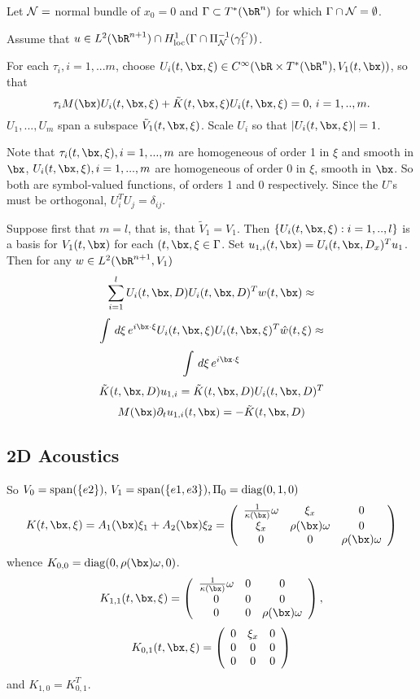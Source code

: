 Let ${\cal N} = $ normal bundle of $x_0=0$ and $\Gamma \subset T^*(\bR^n)$ for which $\Gamma \cap {\cal N} = \emptyset$.

Assume that $u \in L^2(\bR^{n+1}) \cap H^1_{\rm loc}(\Gamma \cap \Pi_{\cal N}^{-1}(\gamma_1^C))$.



For each $\tau_i, i =1,...m$, choose $U_i(t,\bx,\xi) \in C^{\infty}(\bR \times T^*(\bR^n),V_1(t,\bx))$,  so that
\[
  \tau_i M(\bx) U_i(t,\bx,\xi) + \tilde{K}(t,\bx,\xi) U_i(t,\bx,\xi)=0, \, i=1,..,m.
\]
$U_1,...,U_m$ span a subspace $\tilde{V}_1(t,\bx,\xi)$. Scale $U_i$ so that $|U_i(t,\bx,\xi)| = 1$.

Note that $\tau_i(t,\bx,\xi), i=1,...,m$ are homogeneous of order 1 in $\xi$ and smooth in $\bx$, $U_i(t,\bx,\xi), i=1,...,m$ are homogeneous of order 0 in $\xi$, smooth in $\bx$. So both are symbol-valued functions, of orders 1 and 0 respectively. Since the $U$'s must be orthogonal, $U_i^TU_j = \delta_{ij}$.

Suppose first that $m=l$, that is, that $\tilde{V}_1=V_1$. Then $\{U_i(t,\bx,\xi):i=1,..,l\}$ is a basis for $V_1(t,\bx)$ for each $(t,\bx,\xi \in \Gamma$. Set $u_{1,i}(t,\bx) = U_i(t,\bx,D_x)^Tu_1$. Then for any $w \in L^2(\bR^{n+1},V_1)$
\[
  \sum_{i=1}^l U_i(t,\bx,D)U_i(t,\bx,D)^Tw(t,\bx) \approx
\]
\[
  \int \, d\xi \, e^{i \bx \cdot \xi} U_i(t,\bx,\xi)U_i(t,\bx,\xi)^T\hat{w}(t,\xi) \approx
\]
\[
  \int \, d\xi \, e^{i \bx \cdot \xi}
\]
\[
  \tilde{K}(t,\bx,D)u_{1,i} = \tilde{K}(t,\bx,D)U_i(t,\bx,D)^T
\]
\[
  M(\bx)\partial_t u_{1,i}(t,\bx) = -\tilde{K}(t,\bx,D)
\]

\subsection{2D Acoustics}
So $V_0={\rm span}(\{e2\}),\, V_1={\rm span}(\{e1,e3\}), \Pi_0 = {\rm diag}(0,1,0)$ 
\[
  K(t,\bx,\xi) =  A_1(\bx) \xi_1 + A_2(\bx) \xi_2 =
  \left(
    \begin{array}{ccc}
      \frac{1}{\kappa(\bx)}\omega & \xi_x & 0 \\
      \xi_x & \rho(\bx) \omega & 0 \\
      0 & 0 & \rho(\bx) \omega
    \end{array}
  \right)
\]
whence $K_{0,0} = {\rm diag}(0, \rho(\bx) \omega, 0)$.
\[
  K_{1,1}(t,\bx,\xi) =
  \left(
    \begin{array}{ccc}
      \frac{1}{\kappa(\bx)}\omega & 0 & 0 \\
      0 & 0 & 0 \\
      0 & 0 & \rho(\bx) \omega
    \end{array}
  \right),
\]
\[
  K_{0,1}(t,\bx,\xi) =
  \left(
    \begin{array}{ccc}
      0 & \xi_x & 0 \\
      0 & 0 & 0 \\
      0 & 0 & 0
    \end{array}
  \right)
\]
and $K_{1,0} = K_{0,1}^T$.
  
